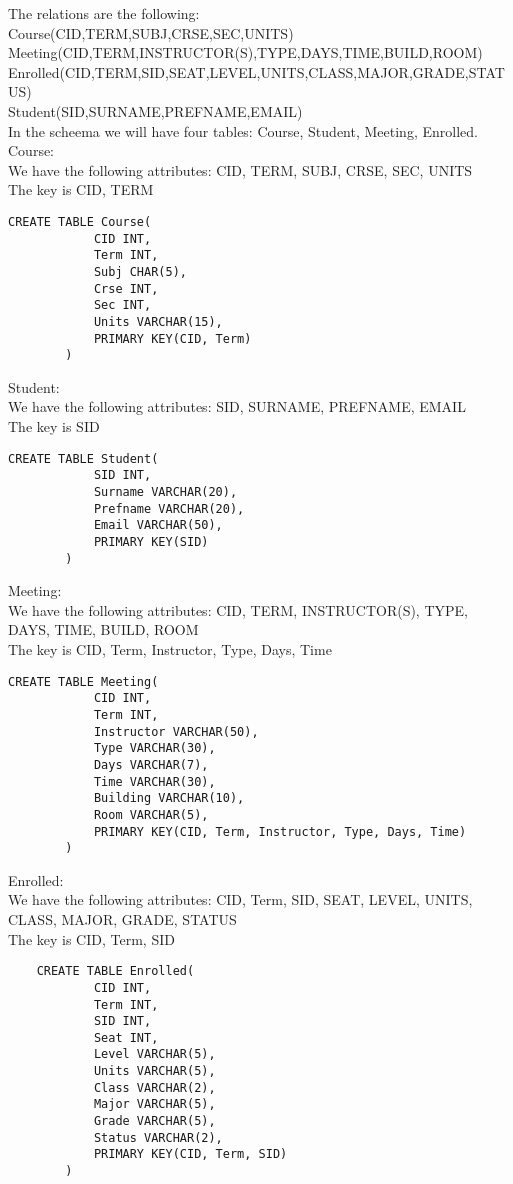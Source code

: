 

The relations are the following: \\

Course(CID,TERM,SUBJ,CRSE,SEC,UNITS) \\
Meeting(CID,TERM,INSTRUCTOR(S),TYPE,DAYS,TIME,BUILD,ROOM) \\
Enrolled(CID,TERM,SID,SEAT,LEVEL,UNITS,CLASS,MAJOR,GRADE,STATUS) \\
Student(SID,SURNAME,PREFNAME,EMAIL) \\ 

In the scheema we will have four tables: Course, Student, Meeting, Enrolled. \\

Course: \\
We have the following attributes: CID, TERM, SUBJ, CRSE, SEC, UNITS \\
The key is CID, TERM \\
\begin{verbatim}
CREATE TABLE Course(
			CID INT,
			Term INT,
			Subj CHAR(5),
			Crse INT,
			Sec INT,
			Units VARCHAR(15),
			PRIMARY KEY(CID, Term)
		)
\end{verbatim}

Student: \\
We have the following attributes: SID, SURNAME, PREFNAME, EMAIL \\
The key is SID \\

\begin{verbatim}
CREATE TABLE Student(
			SID INT,
			Surname VARCHAR(20),
			Prefname VARCHAR(20),
			Email VARCHAR(50),
			PRIMARY KEY(SID)
		)
\end{verbatim}


Meeting:\\
We have the following attributes: CID, TERM, INSTRUCTOR(S), TYPE, DAYS, TIME, BUILD, ROOM\\
The key is CID, Term, Instructor, Type, Days, Time \\


\begin{verbatim}
CREATE TABLE Meeting(
			CID INT,
			Term INT,
			Instructor VARCHAR(50),
			Type VARCHAR(30),
			Days VARCHAR(7),
			Time VARCHAR(30),
			Building VARCHAR(10),
			Room VARCHAR(5),
			PRIMARY KEY(CID, Term, Instructor, Type, Days, Time)
		)
\end{verbatim}

Enrolled: \\
We have the following attributes:  CID, Term, SID, SEAT, LEVEL, UNITS, CLASS, MAJOR, GRADE, STATUS \\
The key is CID, Term, SID \\


\begin{verbatim}
	CREATE TABLE Enrolled(
			CID INT,
			Term INT,
			SID INT,
			Seat INT,
			Level VARCHAR(5),
			Units VARCHAR(5),
			Class VARCHAR(2),
			Major VARCHAR(5),
			Grade VARCHAR(5),
			Status VARCHAR(2),
			PRIMARY KEY(CID, Term, SID)
		)
\end{verbatim}


